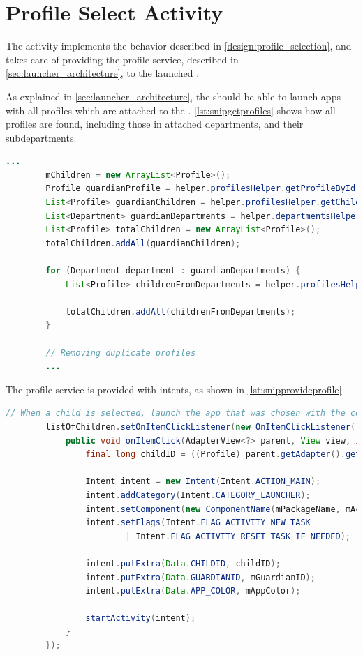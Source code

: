 \section{Profile Select Activity}

The  activity implements the behavior described in \autoref{design:profile_selection}, and takes care of providing the profile service, described in \autoref{sec:launcher_architecture}, to the launched \girafapp[].

As explained in \autoref{sec:launcher_architecture}, the \guardian[] should be able to launch apps with all profiles which are attached to the \guardian[]. \autoref{lst:snipgetprofiles} shows how all profiles are found, including those in attached departments, and their subdepartments.

\begin{lstlisting}[style=sourceCode, language=JAVA, caption=Snippet of the \method{loadApplications} method, label=lst:snipgetprofiles]
		...
		mChildren = new ArrayList<Profile>();
		Profile guardianProfile = helper.profilesHelper.getProfileById(mGuardianID);
		List<Profile> guardianChildren = helper.profilesHelper.getChildrenByGuardian(guardianProfile);
		List<Department> guardianDepartments = helper.departmentsHelper.getDepartmentsByProfile(guardianProfile);
		List<Profile> totalChildren = new ArrayList<Profile>();
		totalChildren.addAll(guardianChildren);
		
		for (Department department : guardianDepartments) {
			List<Profile> childrenFromDepartments = helper.profilesHelper.getChildrenByDepartmentAndSubDepartments(department);
			
			totalChildren.addAll(childrenFromDepartments);
		}
		
		// Removing duplicate profiles
		...
\end{lstlisting}

The profile service is provided with intents, as shown in \autoref{lst:snipprovideprofile}.

\begin{lstlisting}[style=sourceCode, language=JAVA, caption=Snippet of the \method{loadApplications} method, label=lst:snipprovideprofile]
		// When a child is selected, launch the app that was chosen with the correct data in the extras.
		listOfChildren.setOnItemClickListener(new OnItemClickListener() {
			public void onItemClick(AdapterView<?> parent, View view, int position, long id) {
				final long childID = ((Profile) parent.getAdapter().getItem(position)).getId();

				Intent intent = new Intent(Intent.ACTION_MAIN);
				intent.addCategory(Intent.CATEGORY_LAUNCHER);
				intent.setComponent(new ComponentName(mPackageName, mActivityName));
				intent.setFlags(Intent.FLAG_ACTIVITY_NEW_TASK
						| Intent.FLAG_ACTIVITY_RESET_TASK_IF_NEEDED);

				intent.putExtra(Data.CHILDID, childID);
				intent.putExtra(Data.GUARDIANID, mGuardianID);
				intent.putExtra(Data.APP_COLOR, mAppColor);

				startActivity(intent);
			}
		});
\end{lstlisting}

